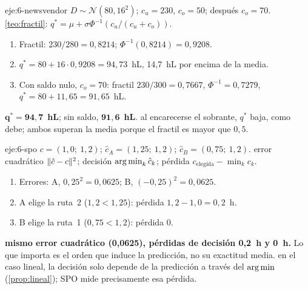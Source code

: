 \begin{solucion}{eje:6-newsvendor}
\datos $D\sim\mathcal N(80,16^{2})$; $c_u=230$, $c_o=50$; después $c_o=70$.
\planteamiento \cref{teo:fractil}: $q^{*}=\mu+\sigma\Phi^{-1}(c_u/(c_u+c_o))$.
\pasos
\begin{enumerate}[label=\arabic*.]
  \item Fractil: $230/280=0{,}8214$; $\Phi^{-1}(0{,}8214)=0{,}9208$.
  \item $q^{*}=80+16\cdot 0{,}9208=94{,}73$~hL, 14,7~hL por encima de la media.
  \item Con saldo nulo, $c_o=70$: fractil $230/300=0{,}7667$, $\Phi^{-1}=0{,}7279$, $q^{*}=80+11{,}65=91{,}65$~hL.
\end{enumerate}
\resultado $\bm{q^{*}=94{,}7}$~\textbf{hL}; sin saldo, $\bm{91{,}6}$~\textbf{hL}.
\comprobacion al encarecerse el sobrante, $q^{*}$ baja, como debe; ambos superan la media porque el fractil es mayor que $0{,}5$.
\end{solucion}

\begin{solucion}{eje:6-spo}
\datos $c=(1{,}0;\ 1{,}2)$; $\hat c_A=(1{,}25;\ 1{,}2)$; $\hat c_B=(0{,}75;\ 1{,}2)$.
\planteamiento error cuadrático $\lVert\hat c-c\rVert^{2}$; decisión $\operatorname*{arg\,min}_k\hat c_k$; pérdida $c_{\text{elegida}}-\min_kc_k$.
\pasos
\begin{enumerate}[label=\arabic*.]
  \item Errores: A, $0{,}25^{2}=0{,}0625$; B, $(-0{,}25)^{2}=0{,}0625$.
  \item A elige la ruta~2 ($1{,}2<1{,}25$): pérdida $1{,}2-1{,}0=0{,}2$~h.
  \item B elige la ruta~1 ($0{,}75<1{,}2$): pérdida 0.
\end{enumerate}
\resultado \textbf{mismo error cuadrático (0,0625), pérdidas de decisión 0,2~h y 0~h.} Lo que importa es el orden que induce la predicción, no su exactitud media.
\comprobacion en el caso lineal, la decisión solo depende de la predicción a través del $\operatorname*{arg\,min}$ (\cref{prop:lineal}); SPO mide precisamente esa pérdida.
\end{solucion}

